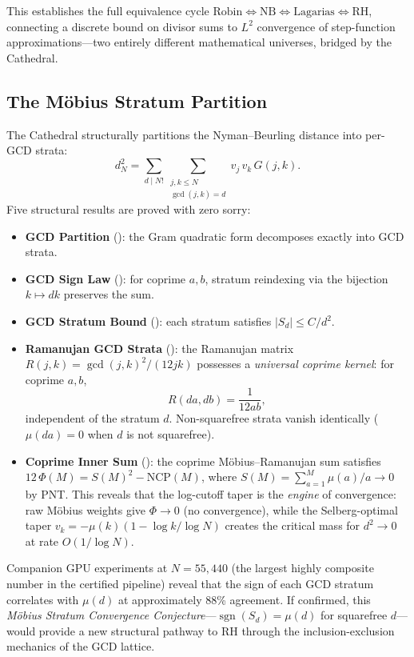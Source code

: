 \documentclass[11pt,a4paper]{article}
\begin{document}
This establishes the full equivalence cycle
$\text{Robin} \iff \text{NB} \iff \text{Lagarias} \iff \text{RH}$,
connecting a discrete bound on divisor sums to $L^2$ convergence
of step-function approximations---two entirely different mathematical
universes, bridged by the Cathedral.

\subsection{The M\"obius Stratum Partition}
\label{sec:gcd-stratum}

The Cathedral structurally partitions the Nyman--Beurling distance
into per-GCD strata:
\[
  d_N^2 = \sum_{d \mid N!}
    \sum_{\substack{j,k \leq N \\ \gcd(j,k) = d}}
    v_j\,v_k\,G(j,k).
\]
Five structural results are proved with zero sorry:
\begin{itemize}
  \item \textbf{GCD Partition}
    ():
    the Gram quadratic form decomposes exactly into
    GCD strata.
  \item \textbf{GCD Sign Law}
    ():
    for coprime $a,b$, stratum reindexing via
    the bijection $k \mapsto dk$ preserves the sum.
  \item \textbf{GCD Stratum Bound}
    ():
    each stratum satisfies $|S_d| \leq C/d^2$.
  \item \textbf{Ramanujan GCD Strata}
    ():
    the Ramanujan matrix $R(j,k) = \gcd(j,k)^2/(12jk)$
    possesses a \emph{universal coprime kernel}: for coprime $a,b$,
    \[
      R(da, db) = \frac{1}{12ab},
    \]
    independent of the stratum $d$. Non-squarefree strata vanish
    identically ($\mu(da) = 0$ when $d$ is not squarefree).
  \item \textbf{Coprime Inner Sum}
    ():
    the coprime M\"obius--Ramanujan sum satisfies
    $12\,\Phi(M) = S(M)^2 - \mathrm{NCP}(M)$, where
    $S(M) = \sum_{a=1}^{M} \mu(a)/a \to 0$ by PNT. This reveals
    that the log-cutoff taper is the \emph{engine} of convergence:
    raw M\"obius weights give $\Phi \to 0$ (no convergence), while
    the Selberg-optimal taper $v_k = -\mu(k)(1 - \log k/\log N)$
    creates the critical mass for $d^2 \to 0$ at rate $O(1/\log N)$.
\end{itemize}

Companion GPU experiments at $N = 55{,}440$ (the largest highly
composite number in the certified pipeline) reveal that the sign
of each GCD stratum correlates with $\mu(d)$ at approximately
88\% agreement. If confirmed, this \emph{M\"obius Stratum
Convergence Conjecture}---$\operatorname{sgn}(S_d) = \mu(d)$ for
squarefree $d$---would provide a new structural pathway to RH
through the inclusion-exclusion mechanics of the GCD lattice.
\end{document}
